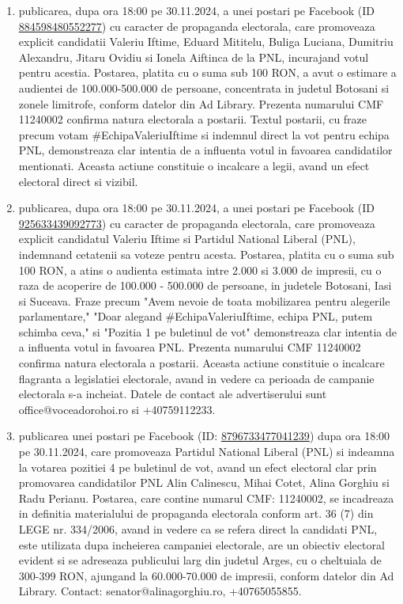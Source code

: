 \documentclass[a4paper,12pt]{article}
\begin{document}
\begin{enumerate}[leftmargin=*, label=\arabic*.)]
    \item publicarea, dupa ora 18:00 pe 30.11.2024, a unei postari pe Facebook (ID \href{https://www.facebook.com/ads/library/?id=884598480552277}{884598480552277}) cu caracter de propaganda electorala, care promoveaza explicit candidatii Valeriu Iftime, Eduard Mititelu, Buliga Luciana, Dumitriu Alexandru, Jitaru Ovidiu si Ionela Aiftinca de la PNL,  incurajand votul pentru acestia. Postarea, platita cu o suma sub 100 RON,  a avut o estimare a audientei de 100.000-500.000 de persoane, concentrata in judetul Botosani si zonele limitrofe, conform datelor din Ad Library.  Prezenta numarului CMF 11240002 confirma natura electorala a postarii.  Textul postarii, cu fraze precum votam \#EchipaValeriuIftime si indemnul direct la vot pentru echipa PNL, demonstreaza clar intentia de a influenta votul in favoarea candidatilor mentionati.  Aceasta actiune constituie o incalcare a legii, avand un efect electoral direct si vizibil.
    \item publicarea, dupa ora 18:00 pe 30.11.2024, a unei postari pe Facebook (ID \href{https://www.facebook.com/ads/library/?id=925633439092773}{925633439092773}) cu caracter de propaganda electorala, care promoveaza explicit candidatul Valeriu Iftime si Partidul National Liberal (PNL), indemnand cetatenii sa voteze pentru acesta. Postarea, platita cu o suma sub 100 RON, a atins o audienta estimata intre 2.000 si 3.000 de impresii, cu o raza de acoperire de 100.000 - 500.000 de persoane, in judetele Botosani, Iasi si Suceava.  Fraze precum "Avem nevoie de toata mobilizarea pentru alegerile parlamentare," "Doar alegand \#EchipaValeriuIftime, echipa PNL, putem schimba ceva," si "Pozitia 1 pe buletinul de vot" demonstreaza clar intentia de a influenta votul in favoarea PNL. Prezenta numarului CMF 11240002 confirma natura electorala a postarii.  Aceasta actiune constituie o incalcare flagranta a legislatiei electorale, avand in vedere ca perioada de campanie electorala s-a incheiat.  Datele de contact ale advertiserului sunt office@voceadorohoi.ro si +40759112233.
    \item publicarea unei postari pe Facebook (ID: \href{https://www.facebook.com/ads/library/?id=8796733477041239}{8796733477041239}) dupa ora 18:00 pe 30.11.2024, care promoveaza Partidul National Liberal (PNL) si indeamna la votarea pozitiei 4 pe buletinul de vot, avand un efect electoral clar prin promovarea candidatilor PNL Alin Calinescu, Mihai Cotet, Alina Gorghiu si Radu Perianu. Postarea, care contine numarul CMF: 11240002, se incadreaza in definitia materialului de propaganda electorala conform art. 36 (7) din LEGE nr. 334/2006, avand in vedere ca se refera direct la candidati PNL, este utilizata dupa incheierea campaniei electorale, are un obiectiv electoral evident si se adreseaza publicului larg din judetul Arges, cu o cheltuiala de 300-399 RON, ajungand la 60.000-70.000 de impresii, conform datelor din Ad Library.  Contact: senator@alinagorghiu.ro, +40765055855.
\end{enumerate}
\end{document}
